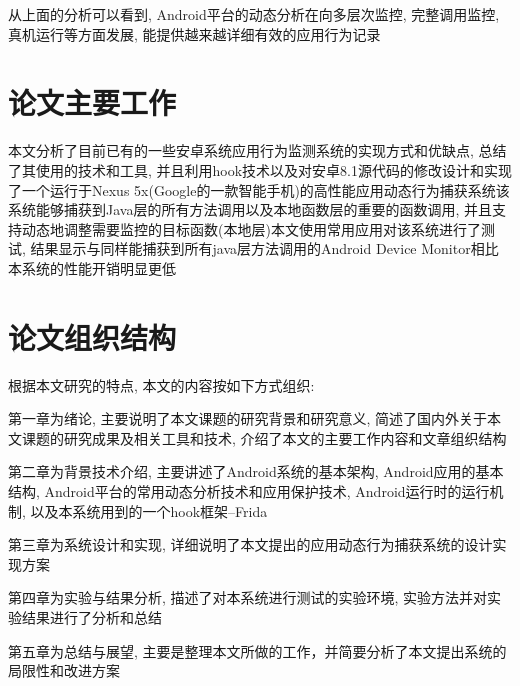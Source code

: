 从上面的分析可以看到, Android平台的动态分析在向多层次监控, 完整调用监控, 真机运行等方面发展, 能提供越来越详细有效的应用行为记录\juhao 

\section{论文主要工作}
本文分析了目前已有的一些安卓系统应用行为监测系统的实现方式和优缺点, 总结了其使用的技术和工具, 并且利用hook技术以及对安卓8.1源代码的修改设计和实现了一个运行于Nexus 5x(Google的一款智能手机)的高性能应用动态行为捕获系统\juhao 该系统能够捕获到Java层的所有方法调用以及本地函数层的重要的函数调用, 并且支持动态地调整需要监控的目标函数(本地层)\juhao  本文使用常用应用对该系统进行了测试, 结果显示与同样能捕获到所有java层方法调用的Android Device Monitor相比本系统的性能开销明显更低\juhao 

\section{论文组织结构}
根据本文研究的特点, 本文的内容按如下方式组织:

第一章为绪论, 主要说明了本文课题的研究背景和研究意义, 简述了国内外关于本文课题的研究成果及相关工具和技术, 介绍了本文的主要工作内容和文章组织结构\juhao 

第二章为背景技术介绍, 主要讲述了Android系统的基本架构, Android应用的基本结构, Android平台的常用动态分析技术和应用保护技术, Android运行时的运行机制, 以及本系统用到的一个hook框架--Frida\juhao

第三章为系统设计和实现, 详细说明了本文提出的应用动态行为捕获系统的设计实现方案\juhao

第四章为实验与结果分析, 描述了对本系统进行测试的实验环境, 实验方法并对实验结果进行了分析和总结\juhao

第五章为总结与展望, 主要是整理本文所做的工作，并简要分析了本文提出系统的局限性和改进方案\juhao

 